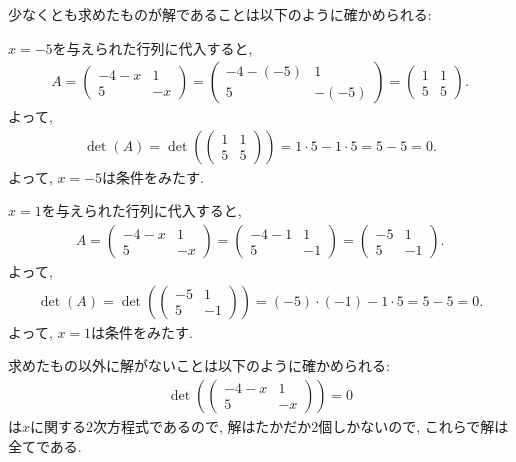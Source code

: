 \begin{checkanswer}%
  少なくとも求めたものが解であることは以下のように確かめられる:
  
  $x=-5$を与えられた行列に代入すると,
  \begin{align*}
    A=
    \begin{pmatrix}
      -4-x&1\\
      5&-x
    \end{pmatrix}
    =
    \begin{pmatrix}
      -4-(-5)&1\\
      5&-(-5)
    \end{pmatrix}
    =
    \begin{pmatrix}
      1&1\\
      5&5
    \end{pmatrix}.
  \end{align*}
  よって,
  \begin{align*}
    \det(A)=\det(
    \begin{pmatrix}
      1&1\\
      5&5
    \end{pmatrix})
    =1\cdot 5-1\cdot 5=5-5=0.
  \end{align*}
  よって, $x=-5$は条件をみたす.

  $x=1$を与えられた行列に代入すると,
  \begin{align*}
    A=
    \begin{pmatrix}
      -4-x&1\\
      5&-x
    \end{pmatrix}
    =
    \begin{pmatrix}
      -4-1&1\\
      5&-1
    \end{pmatrix}
    =
    \begin{pmatrix}
      -5&1\\
      5&-1
    \end{pmatrix}.
  \end{align*}
  よって,
  \begin{align*}
    \det(A)=\det(
    \begin{pmatrix}
      -5&1\\
      5&-1
    \end{pmatrix})
    =(-5)\cdot (-1)-1\cdot 5=5-5=0.
  \end{align*}
  よって, $x=1$は条件をみたす.
\end{checkanswer}
\begin{checkanswer}%
  求めたもの以外に解がないことは以下のように確かめられる:
  \begin{align*}
    \det(
    \begin{pmatrix}
      -4-x&1\\5&-x
    \end{pmatrix})=0
  \end{align*}
  は$x$に関する$2$次方程式であるので, 解はたかだか2個しかないので,
  これらで解は全てである.
\end{checkanswer}

